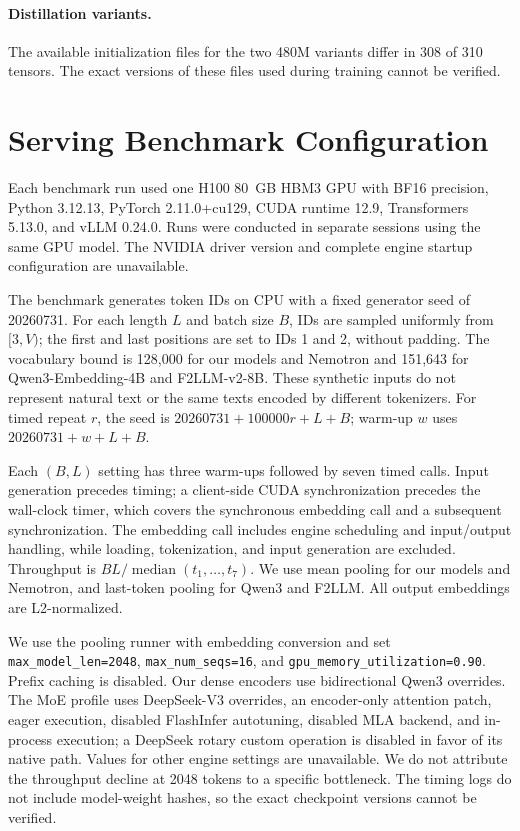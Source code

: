 \documentclass[11pt]{article}
\begin{document}
\paragraph{Distillation variants.}
The available initialization files for the two 480M variants differ in 308 of 310 tensors.
The exact versions of these files used during training cannot be verified.

\section{Serving Benchmark Configuration}
\label{app:serving}

Each benchmark run used one H100 80~GB HBM3 GPU with BF16 precision, Python 3.12.13, PyTorch 2.11.0+cu129, CUDA runtime 12.9, Transformers 5.13.0, and vLLM 0.24.0.
Runs were conducted in separate sessions using the same GPU model.
The NVIDIA driver version and complete engine startup configuration are unavailable.

The benchmark generates token IDs on CPU with a fixed generator seed of 20260731.
For each length $L$ and batch size $B$, IDs are sampled uniformly from $[3,V)$; the first and last positions are set to IDs 1 and 2, without padding.
The vocabulary bound is 128,000 for our models and Nemotron and 151,643 for Qwen3-Embedding-4B and F2LLM-v2-8B.
These synthetic inputs do not represent natural text or the same texts encoded by different tokenizers.
For timed repeat $r$, the seed is $20260731+100000r+L+B$; warm-up $w$ uses $20260731+w+L+B$.

Each $(B,L)$ setting has three warm-ups followed by seven timed calls.
Input generation precedes timing; a client-side CUDA synchronization precedes the wall-clock timer, which covers the synchronous embedding call and a subsequent synchronization.
The embedding call includes engine scheduling and input/output handling, while loading, tokenization, and input generation are excluded.
Throughput is $BL/\operatorname{median}(t_1,\ldots,t_7)$.
We use mean pooling for our models and Nemotron, and last-token pooling for Qwen3 and F2LLM.
All output embeddings are L2-normalized.

We use the pooling runner with embedding conversion and set \texttt{max\_model\_len=2048}, \texttt{max\_num\_seqs=16}, and \texttt{gpu\_memory\_utilization=0.90}.
Prefix caching is disabled.
Our dense encoders use bidirectional Qwen3 overrides.
The MoE profile uses DeepSeek-V3 overrides, an encoder-only attention patch, eager execution, disabled FlashInfer autotuning, disabled MLA backend, and in-process execution; a DeepSeek rotary custom operation is disabled in favor of its native path.
Values for other engine settings are unavailable.
We do not attribute the throughput decline at 2048 tokens to a specific bottleneck.
The timing logs do not include model-weight hashes, so the exact checkpoint versions cannot be verified.
\end{document}
